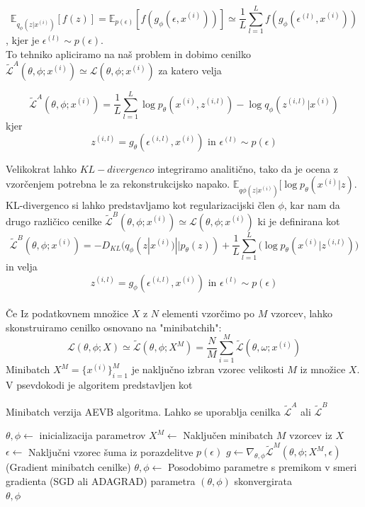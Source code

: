 \documentclass[12pt,a4paper,twoside]{article}
\theoremstyle{definition} %
\theoremstyle{plain} %
\numberwithin{equation}{section}  %
\begin{document}
$$ \mathbb{E}_{q_\phi(z|x^{(i)})}[f(z)] = \mathbb{E}_{p(\epsilon)}[f(g_\phi(\epsilon,x^{(i)}))] \simeq \frac{1}{L}\sum_{l=1}^{L}f(g_\phi(\epsilon^{(l)},x^{(i)})) $$
, kjer je $\epsilon^{(l)} \sim p(\epsilon)$. \\
To tehniko apliciramo na naš problem in dobimo cenilko $\tilde{\mathcal{L}}^A(\theta,\phi;x^{(i)}) \simeq \mathcal{L}(\theta,\phi;x^{(i)})$  za katero velja 

$$  \tilde{\mathcal{L}}^A(\theta,\phi;x^{(i)}) = \frac{1}{L} \sum_{l=1}^L \log{p_\theta (x^({i}),z^{(i,l)})}-\log{q_\phi (z^{(i,l)}|x^{(i)})} $$ kjer 
$$z^{(i,l)} = g_\theta(\epsilon^{(i,l)},x^{(i)}) \text{ in } \epsilon^{(l)} \sim p(\epsilon)$$

Velikokrat lahko $KL-divergenco$ integriramo analitično, tako da je ocena z vzorčenjem potrebna le za rekonstrukcijsko napako. $\mathbb{E}_{q\phi(z|x^{(i)})}[\log{p_\theta(x^{(i)}|z)}$. KL-divergenco si lahko predstavljamo kot regularizacijski člen $\phi$, kar nam 
da drugo različico cenilke $ \widetilde{\mathcal{L}}^B(\theta,\phi;x^{(i)}) \simeq \mathcal{L}(\theta,\phi;x^{(i)}) $ ki je definirana kot 
 $$ \widetilde{\mathcal{L}}^B(\theta,\phi;x^{(i)}) = - D_{KL}(q_\phi(z|x^{(i)})||p_\theta(z)) + \frac{1}{L}\sum_{l=1}^L(\log{p_\theta(x^{(i)}|z^{(i,l)}))} $$ 
in velja $$ z^{(i,l)} = g_\phi(\epsilon^{(i,l)},x^{(i)}) \text{ in }  \epsilon^{(l)} \sim p(\epsilon)$$
\\
Če Iz podatkovnem množice $X$ z $N$ elementi vzorčimo po $M$ vzorcev, lahko skonstruiramo cenilko osnovano na "minibatchih": 
 $$ \mathcal{L}(\theta,\phi;X) \simeq \widetilde{\mathcal{L}}(\theta,\phi;X^M) = \frac{N}{M}\sum_{i=1}^M \widetilde{\mathcal{L}}(\theta,\omega;x^{(i)}) $$ 
Minibatch $X^M = \{ x^{(i)} \}_{i=1}^M$ je naključno izbran vzorec velikosti $M$ iz množice $X$.
V psevdokodi je  algoritem predstavljen kot 
\begin{algorithm}
\caption{Minibatch verzija AEVB algoritma. Lahko se uporablja cenilka $\widetilde{\mathcal{L}}^A$ ali $\widetilde{\mathcal{L}}^B$ }\label{minibatch-aevb}
\begin{algorithmic}[1]
\State $\theta,\phi \leftarrow$  inicializacija parametrov
\Repeat 
	\State $X^M \leftarrow$ Naključen minibatch $M$ vzorcev iz $X$
	\State $\epsilon \leftarrow$ Naključni vzorec šuma iz porazdelitve $p(\epsilon)$
	\State $g \leftarrow \nabla_{\theta,\phi}\widetilde{\mathcal{L}}^M(\theta,\phi;X^M,\epsilon)$ (Gradient minibatch cenilke)
	\State $\theta,\phi \leftarrow$ Posodobimo parametre s premikom v smeri gradienta (SGD ali ADAGRAD)	  
\Until parametra $(\theta,\phi)$ skonvergirata \\
\Return $\theta,\phi$
\end{algorithmic}
\end{algorithm}
\end{document}
